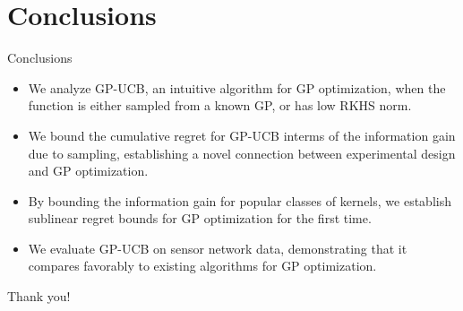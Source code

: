 \documentclass[10pt]{beamer}
\begin{document}
\section{Conclusions}
\begin{frame}{Conclusions}
    \begin{itemize}
    \item We  analyze GP-UCB, an  intuitive  algorithm  for GP optimization, when the function is either sampled from a known GP, or has low RKHS norm.
    \item We bound  the cumulative regret for GP-UCB interms of  the  information gain due to sampling, establishing a novel connection  between experimental design and GP optimization.
    \item By bounding the information gain for popular classes of kernels,  we establish sublinear regret bounds for GP optimization for the first  time.
    \item We  evaluate GP-UCB on  sensor  network data, demonstrating that it compares favorably to existing algorithms for GP optimization.
    \end{itemize}\vspace{.2cm}
\end{frame}

\begin{frame}
    \begin{center}
    {\large Thank you!}
\end{center}
    
\scriptsize
    
    
\end{frame}
\end{document}
